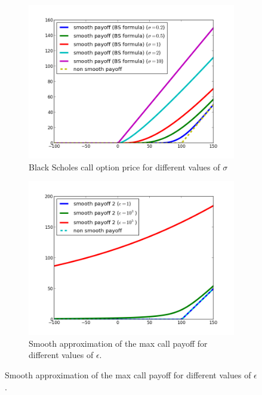 \documentclass[11pt]{article}
\begin{document}
\begin{figure}[!h]
	\centering
	\begin{subfigure}{.5\textwidth}
		\centering
		\includegraphics[width=1\linewidth]{./figures/smooth_non_smooth_payoff.png}
		\caption{Black Scholes call option price for different values of $\sigma$}
		\label{fig:smooth_non_smooth}
	\end{subfigure}%
	\begin{subfigure}{.5\textwidth}
		\centering
		\includegraphics[width=1\linewidth]{./figures/smooth_payoff_2.png}
		\caption{Smooth approximation of the max call payoff for different values of $\epsilon$.}
		\label{fig:smooth_payoff2}
	\end{subfigure}%
\end{figure}
\end{document}
